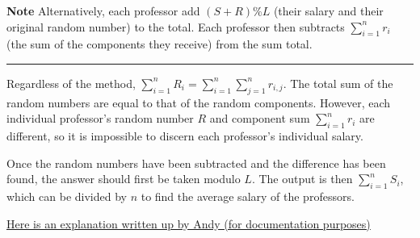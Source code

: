 \documentclass{article}
\begin{document}
\textbf{Note} Alternatively, each professor add $(S + R)\%L$ (their salary and their original random number) to the total. Each professor then subtracts $\sum_{i=1}^{n} r_i$ (the sum of the components they receive) from the sum total.\newline

\noindent\rule{10cm}{0.4pt}\newline

Regardless of the method, $\sum_{i=1}^n R_i = \sum_{i=1}^n \sum_{j=1}^n r_{i,j}$. The total sum of the random numbers are equal to that of the random components. However, each individual professor's random number $R$ and component sum $\sum_{i=1}^n r_i$ are different, so it is impossible to discern each professor's individual salary.\newline

Once the random numbers have been subtracted and the difference has been found, the answer should first be taken modulo $L$. The output is then $\sum_{i=1}^n S_i$, which can be divided by $n$ to find the average salary of the professors.

\newpage
\underline{Here is an explanation written up by Andy (for documentation purposes)}
\end{document}
